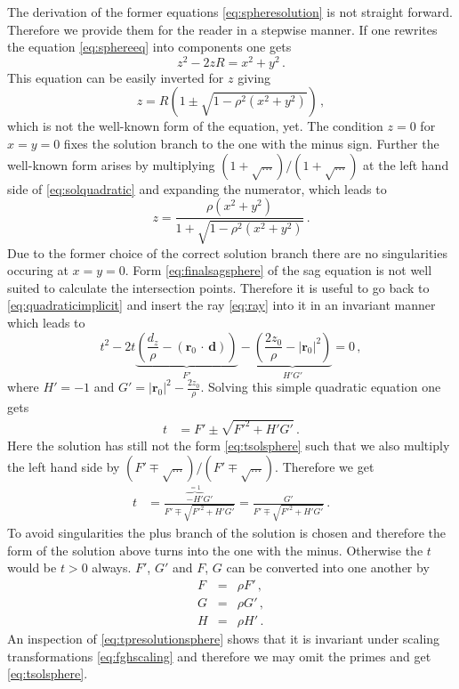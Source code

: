 \documentclass[12pt,a4paper,twoside,openright,BCOR10mm,headsepline,titlepage,abstracton,chapterprefix,final]{scrreprt}
\newcommand\Vector[1]{{\mathbf{#1}}}
\newcommand\Location{\Vector{r}}
\newcommand{\scpm}[2]{(#1\,\cdot\,#2)}
\begin{document}
The derivation of the former equations \eqref{eq:spheresolution} is not straight forward. Therefore we provide them for the reader in a stepwise manner.
If one rewrites the equation \eqref{eq:sphereeq} into components one gets
\begin{equation}
 z^2 - 2 z R = x^2 + y^2 \label{eq:quadraticimplicit}\,.
\end{equation}
This equation can be easily inverted for $z$ giving
\begin{equation}
 z = R \left(1\pm\sqrt{1 - \rho^2 (x^2 + y^2)}\right)\label{eq:solquadratic}\,,
\end{equation}
which is not the well-known form of the equation, yet.
The condition $z=0$ for $x=y=0$ fixes the solution branch to the one 
with the minus sign. Further the well-known form arises by multiplying 
$(1+ \sqrt{\dots})/(1+\sqrt{\dots})$ at the left hand side
of \eqref{eq:solquadratic} and expanding the numerator, which leads to
\begin{equation}
 z = \frac{\rho (x^2 + y^2)}{1 + \sqrt{1 - \rho^2 (x^2 + y^2)}} \label{eq:finalsagsphere}\,.
\end{equation}
Due to the former choice of the correct solution branch there are no
singularities occuring at $x=y=0$. Form \eqref{eq:finalsagsphere} of the 
sag equation is not well suited to calculate the intersection points. Therefore it is 
useful to go back to \eqref{eq:quadraticimplicit} and insert the ray \eqref{eq:ray}
into it in an invariant manner which leads to
\begin{equation}
 t^2 - 2 t \underbrace{\left(\frac{d_z}{\rho} - \scpm{\Location_0}{\Vector{d}}\right)}_{F'} 
    - \underbrace{\left(\frac{2 z_0}{\rho} - |\Location_0|^2\right)}_{H' G'} = 0\,,\label{eq:teqsphere}
\end{equation}
where $H' = -1$ and $G' = |\Location_0|^2 - \tfrac{2 z_0}{\rho}$.
Solving this simple quadratic equation one gets
\begin{align}
 t &= F' \pm \sqrt{{F'}^2 + H' G'}\,.
\end{align}
Here the solution has still not the form \eqref{eq:tsolsphere} such that
we also multiply the left hand side by $(F' \mp \sqrt{\dots})/(F' \mp \sqrt{\dots})$.
Therefore we get
\begin{align}
 t &= \frac{\overbrace{-H'}^{=1} G'}{F' \mp \sqrt{{F'}^2 + H' G'}} = \frac{G'}{F' \mp \sqrt{{F'}^2 + H' G'}}\label{eq:tpresolutionsphere}\,.
\end{align}
To avoid singularities the plus branch of the solution is chosen and therefore the
form of the solution above turns into the one with the minus. Otherwise the $t$ would be
$t>0$ always. $F'$, $G'$ and $F$, $G$ can be converted into one another by
\begin{subequations}
\label{eq:fghscaling}
\begin{eqnarray}
 F &=& \rho F'\,,\\
 G &=& \rho G'\,,\\
 H &=& \rho H'\,.
\end{eqnarray}
\end{subequations}
An inspection of \eqref{eq:tpresolutionsphere} shows that it is invariant under scaling transformations \eqref{eq:fghscaling}
and therefore we may omit the primes and get \eqref{eq:tsolsphere}.
\end{document}
